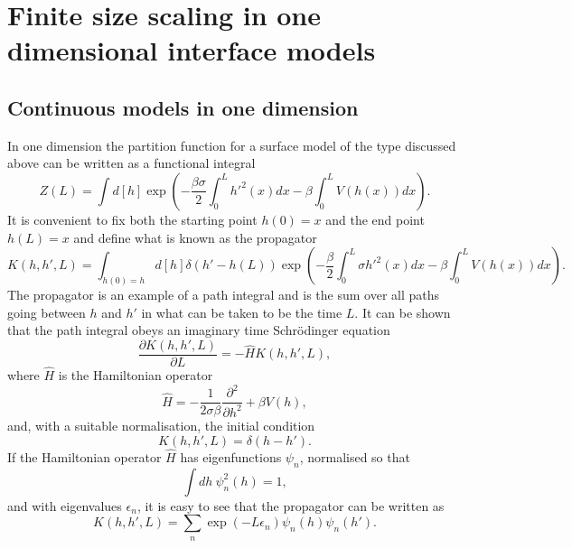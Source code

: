     \section{Finite size scaling in one dimensional interface models}

\subsection{Continuous models in one dimension}

In one dimension the partition function for a surface model of the type discussed above can be written as a functional integral  
\begin{equation}
    Z(L)  = \int d[h]\exp\left(-\frac{\beta\sigma}{2}\int_0^L h'^2(x) dx -\beta\int_0^L  V(h(x)) dx\right).
\end{equation}
It is convenient to fix both the starting point $h(0)=x$ and the end point $h(L)=x$ and define what is known as the propagator
\begin{equation}
    K(h,h',L)=\int_{h(0)=h} d[h] \delta(h' -h(L)) \exp\left(-\frac{\beta}{2}\int_0^L \sigma h'^2(x) dx -\beta \int_0^L  V(h(x)) dx\right).
    \label{prog}
\end{equation}
The propagator is an example of a path integral and is the sum over all paths going between 
$h$ and $h'$ in what can be taken to be the time $L$.  It can be shown that the path integral obeys an imaginary time Schr\"odinger equation
\begin{equation}
    \frac{\partial  K(h,h',L)}{\partial L} = -\hat H K(h,h',L),
\end{equation}
where $\hat H$ is the Hamiltonian operator
\begin{equation}
    \hat H = -\frac{1}{2\sigma\beta}\frac{\partial^2 }{\partial h^2} + \beta V(h),
\end{equation}
and, with a suitable normalisation, the initial condition
\begin{equation}
    K(h,h',L)=\delta(h-h').
\end{equation}
If the Hamiltonian operator $\hat H$ has eigenfunctions $\psi_n$, normalised so that
\begin{equation}
    \int dh \ \psi^2_n(h) = 1,
\end{equation}
 and with eigenvalues $\epsilon_n$, it is easy to see that the propagator can be written as
\begin{equation}
    K(h,h',L)= \sum_n \exp(-L\epsilon_n)\psi_n(h)\psi_n(h').
\end{equation}
